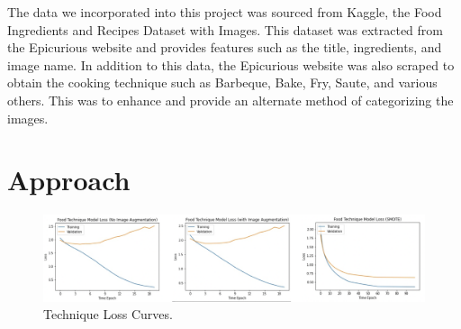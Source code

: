 \documentclass[10pt,twocolumn,letterpaper]{article}
\begin{document}
The data we incorporated into this project was sourced from Kaggle, the Food Ingredients and Recipes Dataset with Images. This dataset was extracted from the Epicurious website and provides features such as the title, ingredients, and image name. In addition to this data, the Epicurious website was also scraped to obtain the cooking technique such as Barbeque, Bake, Fry, Saute, and various others. This was to enhance and provide an alternate method of categorizing the images.
\section{Approach}
\begin{figure}
\begin{center}
\includegraphics[width=1.0\linewidth]{technique_model_loss_curve}
\end{center}
  \caption{Technique Loss Curves.}
\label{fig:loss_curve}
\end{figure}
\end{document}
